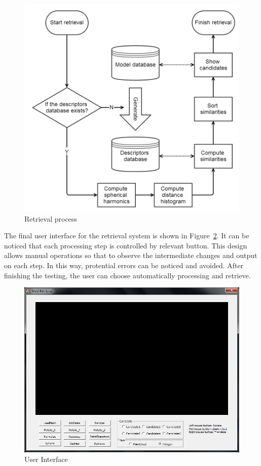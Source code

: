 \begin{figure}[h]
\centering
\includegraphics[width=1\linewidth]{scan2search_main}
\caption{Retrieval process} \label{scan2search_main}
\end{figure}

The final user interface for the retrieval system is shown in Figure~\ref{UI}. It can be noticed that each processing step is controlled by relevant button. This design allows manual operations so that to observe the intermediate changes and output on each step. In this way, protential errors can be noticed and avoided. After finishing the testing, the user can choose automatically processing and retrieve.

\begin{figure}[h]
\centering
\includegraphics[width=0.7\linewidth]{UI}
\caption{User Interface} \label{UI}
\end{figure}

